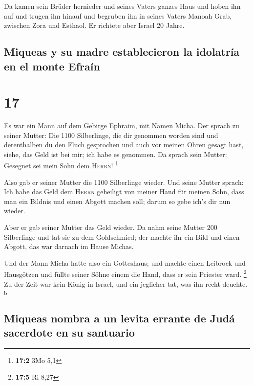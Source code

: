  Da kamen sein Brüder hernieder und seines Vaters ganzes
Haus und hoben ihn auf und trugen ihn hinauf und begruben ihn in seines
Vaters Manoah Grab, zwischen Zora und Esthaol. Er richtete aber Israel
20 Jahre.

\hypertarget{miqueas-y-su-madre-establecieron-la-idolatruxeda-en-el-monte-efrauxedn}{%
\subsection{Miqueas y su madre establecieron la idolatría en el monte
Efraín}\label{miqueas-y-su-madre-establecieron-la-idolatruxeda-en-el-monte-efrauxedn}}

\hypertarget{section-16}{%
\section{17}\label{section-16}}

 Es war ein Mann auf dem Gebirge Ephraim, mit Namen Micha.
 Der sprach zu seiner Mutter: Die 1100 Silberlinge, die
dir genommen worden sind und derenthalben du den Fluch gesprochen und
auch vor meinen Ohren gesagt hast, siehe, das Geld ist bei mir; ich habe
es genommen. Da sprach sein Mutter: Gesegnet sei mein Sohn dem
\textsc{Herrn}! \footnote{\textbf{17:2} 3Mo 5,1}

 Also gab er seiner Mutter die 1100 Silberlinge wieder.
Und seine Mutter sprach: Ich habe das Geld dem \textsc{Herrn} geheiligt
von meiner Hand für meinen Sohn, dass man ein Bildnis und einen Abgott
machen soll; darum so gebe ich's dir nun wieder.

 Aber er gab seiner Mutter das Geld wieder. Da nahm seine
Mutter 200 Silberlinge und tat sie zu dem Goldschmied; der machte ihr
ein Bild und einen Abgott, das war darnach im Hause Michas.

 Und der Mann Micha hatte also ein Gotteshaus; und machte
einen Leibrock und Hausgötzen und füllte seiner Söhne einem die Hand,
dass er sein Priester ward. \footnote{\textbf{17:5} Ri 8,27}
 Zu der Zeit war kein König in Israel, und ein jeglicher
tat, was ihn recht deuchte. \textsuperscript{b}

\hypertarget{miqueas-nombra-a-un-levita-errante-de-juduxe1-sacerdote-en-su-santuario}{%
\subsection{Miqueas nombra a un levita errante de Judá sacerdote en su
santuario}\label{miqueas-nombra-a-un-levita-errante-de-juduxe1-sacerdote-en-su-santuario}}

